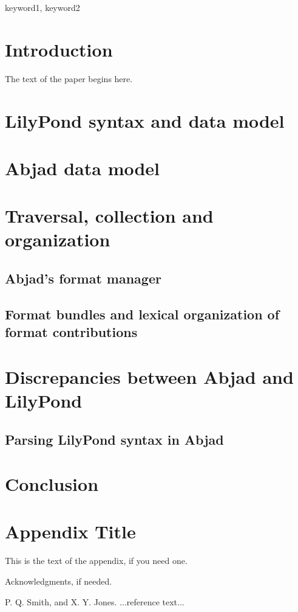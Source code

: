 \documentclass{sigplanconf}
\begin{document}
\keywords
keyword1, keyword2

\section{Introduction}

The text of the paper begins here.

\section{LilyPond syntax and data model}

\section{Abjad data model}

\section{Traversal, collection and organization}

\subsection{Abjad's format manager}

\subsection{Format bundles and lexical organization of format contributions}

\section{Discrepancies between Abjad and LilyPond}

\subsection{Parsing LilyPond syntax in Abjad}

\section{Conclusion}

\appendix
\section{Appendix Title}

This is the text of the appendix, if you need one.

\acks

Acknowledgments, if needed.





\begin{thebibliography}{}
\softraggedright

P. Q. Smith, and X. Y. Jones. ...reference text...

\end{thebibliography}
\end{document}
